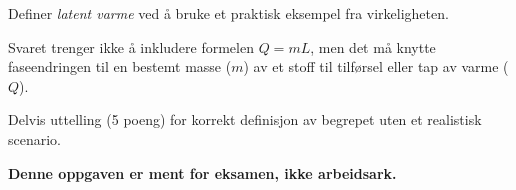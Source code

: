 

Definer {\it latent varme} ved å bruke et praktisk eksempel fra virkeligheten.

\vskip 50pt







Svaret trenger ikke å inkludere formelen $Q = mL$, men det må knytte faseendringen til en bestemt masse ($m$) av et stoff til tilførsel eller tap av varme ($Q$).

\vskip 10pt

Delvis uttelling (5 poeng) for korrekt definisjon av begrepet uten et realistisk scenario.







{\bf Denne oppgaven er ment for eksamen, ikke arbeidsark.}


